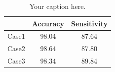 \begin{table}[ht]
\renewcommand{\arraystretch}{1.3}  %
\centering
\caption{Your caption here.}
\begin{tabular}{lcc}
\hline
 & \textbf{Accuracy} & \textbf{Sensitivity} \\
\hline
Case1 & 98.04 & 87.64 \\
Case2 & 98.64 & 87.80 \\
Case3 & 98.34 & 89.84 \\
\hline
\end{tabular}
\label{tab:results}
\end{table}